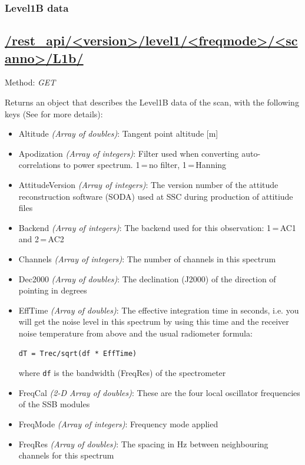 \subsubsection{Level1B data}
\subsection*{\url{/rest_api/<version>/level1/<freqmode>/<scanno>/L1b/}}
Method: \emph{GET}

Returns an object that describes the Level1B data of the scan,
with the following keys (See \citet{atbdl1b} for more details):

\begin{itemize}

  \item Altitude \emph{(Array of doubles)}: Tangent point altitude [m]
  \item Apodization \emph{(Array of integers)}: Filter used when converting
    auto-correlations to power spectrum. 1\,=\,no filter, 1\,=\,Hanning
  \item AttitudeVersion \emph{(Array of integers)}: The version number of the attitude reconstruction software (SODA)
    used at SSC during production of attitiude files
  \item Backend \emph{(Array of integers)}: The backend used for this observation: 1\,=\,AC1 and 2\,=\,AC2
  \item Channels \emph{(Array of integers)}: The number of channels in this spectrum
  \item Dec2000 \emph{(Array of doubles)}: The declination (J2000) of the direction of pointing in degrees
  \item EffTime \emph{(Array of doubles)}: The effective integration time in seconds, i.e. you will get the
                         noise level in this spectrum by using this time and the receiver noise
                         temperature from above and the usual radiometer formula:
                        \begin{verbatim}dT = Trec/sqrt(df * EffTime)\end{verbatim}
                         where {\tt df} is the bandwidth (FreqRes) of the spectrometer
  \item FreqCal \emph{(2-D Array of doubles)}:  These are the four local oscillator frequencies of the SSB modules
  \item FreqMode \emph{(Array of integers)}: Frequency mode applied
  \item FreqRes \emph{(Array of doubles)}: The spacing in Hz between neighbouring channels for this spectrum

\end{itemize}
